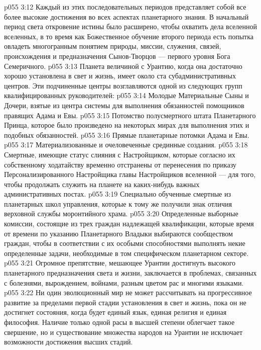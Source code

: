 \vs p055 3:12 Каждый из этих последовательных периодов представляет собой все более высокие достижения во всех аспектах планетарного знания. В начальный период света откровение истины было расширено, чтобы охватить дела вселенной вселенных, в то время как Божественное обучение второго периода есть попытка овладеть многогранным понятием природы, миссии, служения, связей, происхождения и предназначения Сынов\hyp{}Творцов --- первого уровня Бога Семеричного.
\vs p055 3:13 \pc Планета величиной с Урантию, когда она достаточно хорошо установлена в свет и жизнь, имеет около ста субадминистративных центров. Эти подчиненные центры возглавляются одной из следующих групп квалифицированных руководителей:
\vs p055 3:14 \bibnobreakspace Молодые Материальные Сыны и Дочери, взятые из центра системы для выполнения обязанностей помощников правящих Адама и Евы.
\vs p055 3:15 \bibnobreakspace Потомство полусмертного штата Планетарного Принца, которое было произведено на некоторых мирах для выполнения этих и подобных обязанностей.
\vs p055 3:16 \bibnobreakspace Прямые планетарные потомки Адама и Евы.
\vs p055 3:17 \bibnobreakspace Материализованные и очеловеченные срединные создания.
\vs p055 3:18 \bibnobreakspace Смертные, имеющие статус слияния с Настройщиком, которые согласно их собственному ходатайству временно отстранены от перенесения по приказу Персонализированного Настройщика главы Настройщиков вселенной --- для того, чтобы продолжать служить на планете на каких\hyp{}нибудь важных административных постах.
\vs p055 3:19 \bibnobreakspace Специально обученные смертные из планетарных школ управления, которые к тому же получили знак отличия верховной службы моронтийного храма.
\vs p055 3:20 \bibnobreakspace Определенные выборные комиссии, состоящие из трех граждан надлежащей квалификации, которые время от времени по указанию Планетарного Владыки выбираются сообществом граждан, чтобы в соответствии с их особыми способностями выполнять некие определенные задачи, необходимые в том специфическом планетарном секторе.
\vs p055 3:21 \pc Огромное препятствие, мешающее Урантии достигнуть высокого планетарного предназначения света и жизни, заключается в проблемах, связанных с болезнями, вырождением, войнами, разным цветом рас и многими языками.
\vs p055 3:22 Ни один эволюционный мир не может рассчитывать на прогрессивное развитие за пределами первой стадии установления в свет и жизнь, пока он не достигнет состояния, когда будет единый язык, единая религия и единая философия. Наличие только одной расы в высшей степени облегчает такое свершение, но и существование множества народов на Урантии не исключает возможности достижения высших стадий.
